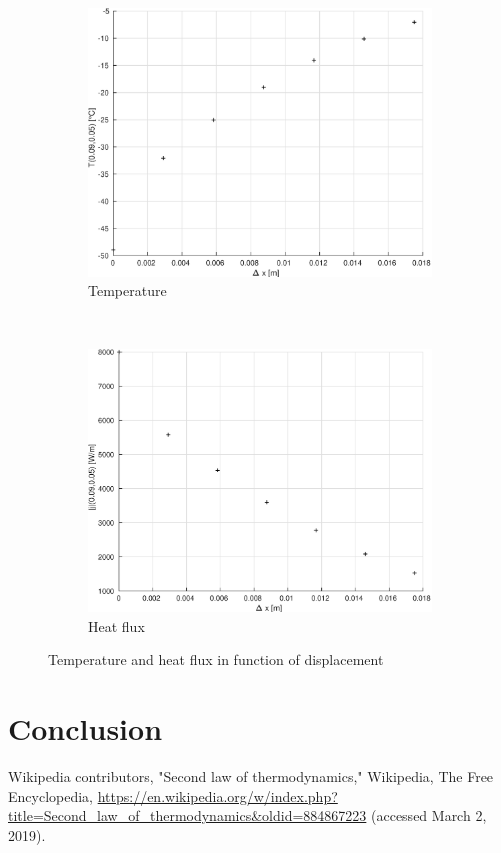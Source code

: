 \documentclass[a4paper,12pt,twoside]{article}
\begin{document}
\begin{figure}[h]
  \centering
  \begin{subfigure}[t]{0.45\textwidth}
    \includegraphics[width=\textwidth]{graphs/e_distT.eps}
    \caption{Temperature}
    \label{fig:e-T}
  \end{subfigure}
  ~
  \begin{subfigure}[t]{0.45\textwidth}
    \includegraphics[width=\textwidth]{graphs/e_distF.eps}
    \caption{Heat flux}
    \label{fig:e-T}
  \end{subfigure}
  \caption{Temperature and heat flux in function of displacement}
  \label{fig:e}
\end{figure}

\section{Conclusion}

\begin{thebibliography}{99}
   Wikipedia contributors, "Second law of thermodynamics," Wikipedia, The Free Encyclopedia, \url{https://en.wikipedia.org/w/index.php?title=Second_law_of_thermodynamics&oldid=884867223} (accessed March 2, 2019).


\end{thebibliography}
\end{document}
